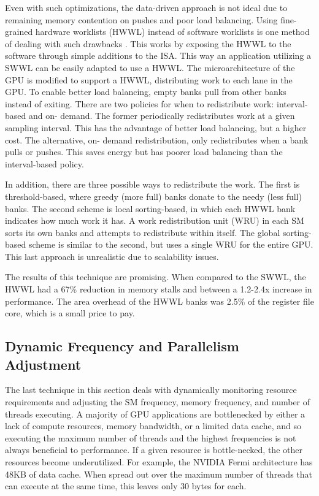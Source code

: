 \documentclass[prodmode,acmtecs]{acmsmall} %
\begin{document}
Even with such optimizations, the data-driven approach is not ideal due to
remaining memory contention on pushes and poor load balancing. Using fine-
grained hardware worklists (HWWL) instead of software worklists is one method of
dealing with such drawbacks
\cite{UsingFineGrainHardwareWorklists}. This works by exposing the HWWL to the
software through simple additions to the ISA. This way an application utilizing
a SWWL can be easily adapted to use a HWWL. The microarchitecture of the GPU is
modified to support a HWWL, distributing work to each lane in the GPU. To enable
better load balancing, empty banks pull from other banks instead of exiting.
There are two policies for when to redistribute work: interval-based and on-
demand. The former periodically redistributes work at a given sampling interval.
This has the advantage of better load balancing, but a higher cost. The
alternative, on- demand redistribution, only redistributes when a bank pulls or
pushes. This saves energy but has poorer load balancing than the interval-based
policy.

In addition, there are three possible ways to redistribute the work. The first
is threshold-based, where greedy (more full) banks donate to the needy (less
full) banks. The second scheme is local sorting-based, in which each HWWL bank
indicates how much work it has. A work redistribution unit (WRU) in each SM
sorts its own banks and attempts to redistribute within itself. The global
sorting-based scheme is similar to the second, but uses a single WRU for the
entire GPU. This last approach is unrealistic due to scalability issues.

The results of this technique are promising. When compared to the SWWL, the HWWL
had a 67\% reduction in memory stalls and between a 1.2-2.4x increase in
performance. The area overhead of the HWWL banks was 2.5\% of the register file
core, which is a small price to pay.

\subsection{Dynamic Frequency and Parallelism Adjustment}
The last technique in this section deals with dynamically monitoring resource
requirements and adjusting the SM frequency, memory frequency, and number of
threads executing. A majority of GPU applications are bottlenecked by either a
lack of compute resources, memory bandwidth, or a limited data cache, and so
executing the maximum number of threads and the highest frequencies is not
always beneficial to performance. If a given resource is bottle-necked, the
other resources become underutilized. For example, the NVIDIA Fermi architecture
has 48KB of data cache. When spread out over the maximum number of threads that
can execute at the same time, this leaves only 30 bytes for each.
\end{document}
